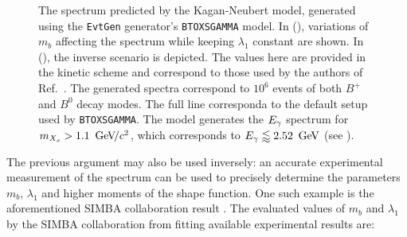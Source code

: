 \begin{figure}[hbtp!]
    \caption{\label{fig:knmodel_variation}
    The \BtoXsgamma spectrum predicted by the Kagan-Neubert model, generated using the \texttt{EvtGen} generator's \texttt{BTOXSGAMMA} model.
    In (), variations of $m_b$ affecting the spectrum while keeping $\lambda_1$ constant are shown.
    In (), the inverse scenario is depicted.
    The values here are provided in the kinetic scheme and correspond to those used by the authors of Ref.~\cite{Kagan:1998ym}.
    The generated spectra correspond to $10^6$ events of both $B^+$ and $B^0$ decay modes.
    The full line corresponda to the default setup used by \texttt{BTOXSGAMMA}.
    The model generates the ${E_{\gamma}}$ spectrum for $m_{X_s}>1.1~{\mathrm{\,Ge\kern -0.1em V\!/}c^2}$, which corresponds to ${E_{\gamma}}\lessapprox2.52~\mathrm{\,Ge\kern -0.1em V}$ (see ).}
\end{figure}

The previous argument may also be used inversely: an accurate experimental measurement of the \BtoXsgamma spectrum
can be used to precisely determine the parameters $m_b$, $\lambda_1$ and higher moments of the shape function.
One such example is the aforementioned SIMBA collaboration result \cite{Bernlochner:2020jlt}.
The evaluated values of $m_b$ and $\lambda_1$ by the SIMBA collaboration from fitting available \BtoXsgamma experimental results are:

